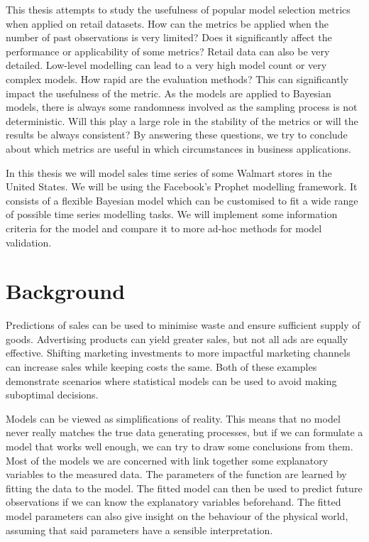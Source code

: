 \documentclass[english, 12pt, a4paper, sci, utf8, a-1b, online]{aaltothesis}
\begin{document}
This thesis attempts to study the usefulness of popular model selection metrics when applied on retail datasets. How can the metrics be applied when the number of past observations is very limited? Does it significantly affect the performance or applicability of some metrics? Retail data can also be very detailed. Low-level modelling can lead to a very high model count or very complex models. How rapid are the evaluation methods? This can significantly impact the usefulness of the metric. As the models are applied to Bayesian models, there is always some randomness involved as the sampling process is not deterministic. Will this play a large role in the stability of the metrics or will the results be always consistent? By answering these questions, we try to conclude about which metrics are useful in which circumstances in business applications.

In this thesis we will model sales time series of some Walmart stores in the United States. We will be using the Facebook's Prophet modelling framework. It consists of a flexible Bayesian model which can be customised to fit a wide range of possible time series modelling tasks. We will implement some information criteria for the model and compare it to more ad-hoc methods for model validation.




\section{Background}


Predictions of sales can be used to minimise waste and ensure sufficient supply of goods. Advertising products can yield greater sales, but not all ads are equally effective. Shifting marketing investments to more impactful marketing channels can increase sales while keeping costs the same. Both of these examples demonstrate scenarios where statistical models can be used to avoid making suboptimal decisions.

Models can be viewed as simplifications of reality. This means that no model never really matches the true data generating processes, but if we can formulate a model that works well enough, we can try to draw some conclusions from them. Most of the models we are concerned with link together some explanatory variables to the measured data. The parameters of the function are learned by fitting the data to the model. The fitted model can then be used to predict future observations if we can know the explanatory variables beforehand. The fitted model parameters can also give insight on the behaviour of the physical world, assuming that said parameters have a sensible interpretation.
\end{document}
